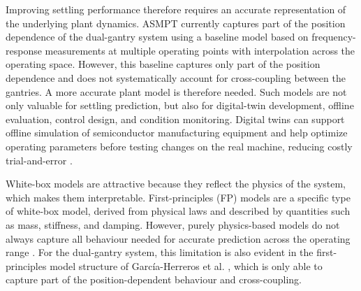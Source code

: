 Improving settling performance therefore requires an accurate representation of the underlying plant dynamics. ASMPT currently captures part of the position dependence of the dual-gantry system using a baseline model based on frequency-response measurements at multiple operating points with interpolation across the operating space.  However, this baseline captures only part of the position dependence and does not systematically account for cross-coupling between the gantries.  A more accurate plant model is therefore needed. Such models are not only valuable for settling prediction, but also for digital-twin development, offline evaluation, control design, and condition monitoring.  Digital twins can support offline simulation of semiconductor manufacturing equipment and help optimize operating parameters before testing changes on the real machine, reducing costly trial-and-error \cite{hwang2024semiconductor}. 

White-box models are attractive because they reflect the physics of the system, which makes them interpretable. First-principles (FP) models are a specific type of white-box model, derived from physical laws and described by quantities such as mass, stiffness, and damping. However, purely physics-based models do not always capture all behaviour needed for accurate prediction across the operating range \cite{willard2020integrating}. For the dual-gantry system, this limitation is also evident in the first-principles model structure of Garc\'ia-Herreros et al. \cite{garcia2013model}, which is only able to capture part of the position-dependent behaviour and cross-coupling. 

